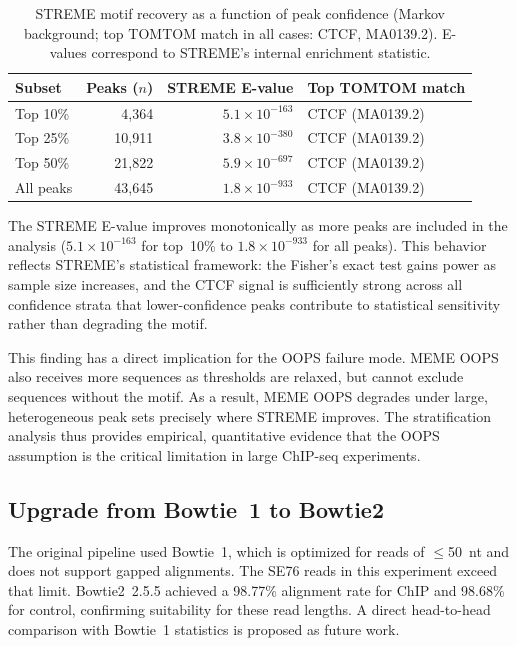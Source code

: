 \documentclass[12pt]{article}
\begin{document}
\begin{table}[htbp]
\centering
\caption{STREME motif recovery as a function of peak confidence (Markov
background; top TOMTOM match in all cases: CTCF, MA0139.2).
E-values correspond to STREME's internal enrichment statistic.}
\label{tab:stratification}
\small
\begin{tabular}{lrrl}
\toprule
\textbf{Subset} & \textbf{Peaks ($n$)} & \textbf{STREME E-value} & \textbf{Top TOMTOM match} \\
\midrule
Top 10\%  & 4,364   & $5.1 \times 10^{-163}$ & CTCF (MA0139.2) \\
Top 25\%  & 10,911  & $3.8 \times 10^{-380}$ & CTCF (MA0139.2) \\
Top 50\%  & 21,822  & $5.9 \times 10^{-697}$ & CTCF (MA0139.2) \\
All peaks & 43,645  & $1.8 \times 10^{-933}$ & CTCF (MA0139.2) \\
\bottomrule
\end{tabular}
\end{table}

The STREME E-value improves monotonically as more peaks are included in the
analysis ($5.1 \times 10^{-163}$ for top~10\% to $1.8 \times 10^{-933}$ for
all peaks). This behavior reflects STREME's statistical framework: the Fisher's
exact test gains power as sample size increases, and the CTCF signal is
sufficiently strong across all confidence strata that lower-confidence peaks
contribute to statistical sensitivity rather than degrading the motif.

This finding has a direct implication for the OOPS failure mode. MEME OOPS
also receives more sequences as thresholds are relaxed, but cannot exclude
sequences without the motif. As a result, MEME OOPS degrades under large,
heterogeneous peak sets precisely where STREME improves. The stratification
analysis thus provides empirical, quantitative evidence that the OOPS assumption
is the critical limitation in large ChIP-seq experiments.

\subsection{Upgrade from Bowtie~1 to Bowtie2}

The original pipeline used Bowtie~1, which is optimized for reads of $\leq$50~nt
and does not support gapped alignments. The SE76 reads in this experiment exceed
that limit. Bowtie2~2.5.5 achieved a 98.77\% alignment rate for ChIP and 98.68\%
for control, confirming suitability for these read lengths. A direct head-to-head
comparison with Bowtie~1 statistics is proposed as future work.
\end{document}
